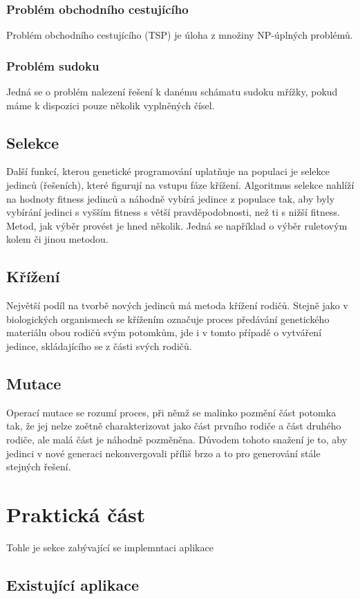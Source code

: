 \documentclass[bc,male,java,dept460]{diploma}		%
\begin{document}
\subsubsection{Problém obchodního cestujícího}
Problém obchodního cestujícího (TSP) je úloha z množiny NP-úplných problémů.

\subsubsection{Problém sudoku}
Jedná se o problém nalezení řešení k danému schámatu sudoku mřížky, pokud máme k dispozici pouze několik vyplněných čísel.


\subsection{Selekce}
Další funkcí, kterou genetické programování uplatňuje na populaci je selekce jedinců (řešeních), které figurují na vstupu fáze křížení. Algoritmus selekce nahlíží na hodnoty fitness jedinců a náhodně vybírá jedince z populace tak, aby byly vybírání jedinci s vyšším fitness s větší pravděpodobnosti, než ti s nižší fitness.
Metod, jak výběr provést je hned několik. Jedná se například o výběr ruletovým kolem či jinou metodou.
\subsection{Křížení}
Největší podíl na tvorbě nových jedinců má metoda křížení rodičů. Stejně jako v biologických organismech se křížením označuje proces předávání genetického materiálu obou rodičů svým potomkům, jde i v tomto případě o vytváření jedince, skládajícího se z části svých rodičů.
\subsection{Mutace}
Operací mutace se rozumí proces, při němž se malinko pozmění část potomka tak, že jej nelze zoětně charakterizovat jako část prvního rodiče a část druhého rodiče, ale malá část je náhodně pozměněna. Důvodem tohoto snažení je to, aby jedinci v nové generaci nekonvergovali příliš brzo a to pro generování stále stejných řešení.

\section{Praktická část}
Tohle je sekce zabývající se implemntaci aplikace

\subsection{Existující aplikace}
\end{document}
